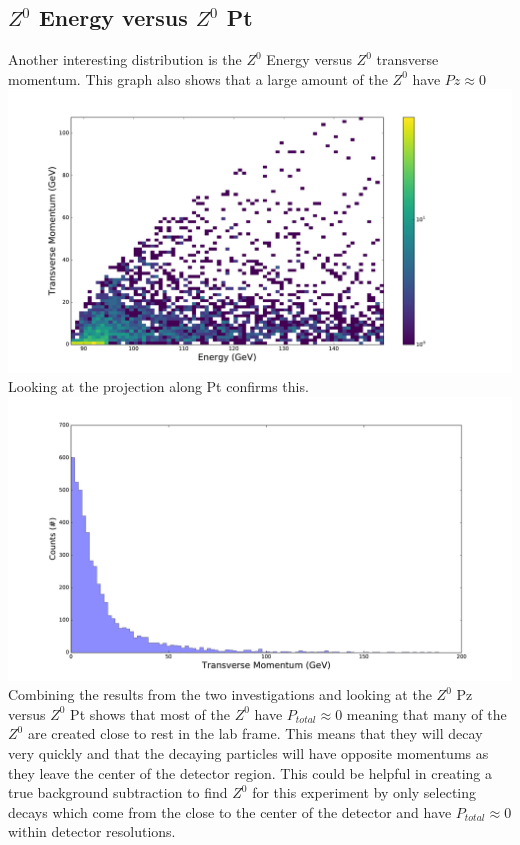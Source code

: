 \documentclass[a4paper, 11pt]{article}
\begin{document}
\subsection*{$Z^0$ Energy versus $Z^0$ Pt}
Another interesting distribution is the $Z^0$ Energy versus $Z^0$ transverse momentum. This graph also shows that a large amount of the $Z^0$ have $Pz \approx 0$ \\
\includegraphics[width=\textwidth]{Z_stuff/ZE_Zpt_log.pdf} \\

Looking at the projection along Pt confirms this. \\ 
\includegraphics[width=\textwidth]{Z_stuff/Zpt.pdf} \\

Combining the results from the two investigations and looking at the $Z^0$ Pz versus $Z^0$ Pt shows that most of the $Z^0$ have $P_{total} \approx 0$ meaning that many of the $Z^0$ are created close to rest in the lab frame.  This means that they will decay very quickly and that the decaying particles will have opposite momentums as they leave the center of the detector region.  This could be helpful in creating a true background subtraction to find $Z^0$ for this experiment by only selecting decays which come from the close to the center of the detector and have $P_{total} \approx 0$ within detector resolutions. \\
\end{document}
